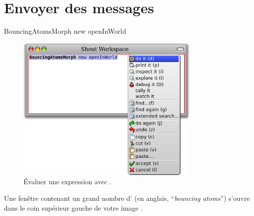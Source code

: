 \documentclass[a4paper,10pt,twoside]{book}
\begin{document}
\section{Envoyer des messages} %


\begin{code}{}
BouncingAtomsMorph new openInWorld
\end{code}


\begin{figure}[htb]
\centerline {\includegraphics[width=0.8\textwidth]{Doit}}
\caption{Évaluer une expression avec .}
\end{figure}

Une fenêtre contenant un grand nombre d'\bamfr
(en anglais, ``\emph{bouncing atoms}'') s'ouvre dans le coin supérieur
gauche de votre image \pharo.
\end{document}
